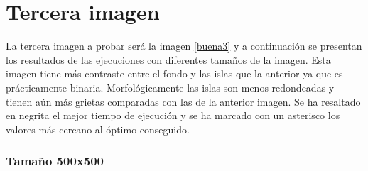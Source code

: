 \section{Tercera imagen}

La tercera imagen a probar ser\'{a} la imagen \ref{buena3} y a continuaci\'{o}n se presentan los resultados de las ejecuciones con diferentes tama\~{n}os de la imagen. Esta imagen tiene m\'{a}s contraste entre el fondo y las islas que la anterior ya que es pr\'{a}cticamente binaria. Morfol\'{o}gicamente las islas son menos redondeadas y tienen a\'{u}n m\'{a}s grietas comparadas con las de la anterior imagen. Se ha resaltado en negrita el mejor tiempo de ejecuci\'{o}n y se ha marcado con un asterisco los valores m\'{a}s cercano al \'{o}ptimo conseguido.

\subsubsection{Tama\~{n}o 500x500}

